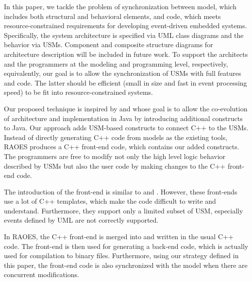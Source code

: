 In this paper, we tackle the problem of synchronization between model, which includes both structural and behavioral elements, and  code, which meets resource-constrained requirements for developing event-driven embedded systems.
Specifically, the system architecture is specified via UML class diagrams and the behavior via USMs.
Component and composite structure diagrams for architecture description will be included in future work.
To support the architects and the programmers at the modeling and programming level, respectively, equivalently, our goal is to allow the synchronization of USMs with full features and code.
The latter should be efficient (small in size and fast in event processing speed) to be fit into resource-constrained systems. 

Our proposed technique  is inspired by  \cite{aldrich2002archjava} and  \cite{ubayashi2010archface} whose goal is to allow the co-evolution of architecture and implementation in Java by introducing additional constructs to Java.
Our approach adds USM-based constructs to connect C++ to the USMs.
Instead of directly generating C++ code from models as the existing tools, RAOES produces a C++ front-end code, which contains our added constructs.
The programmers are free to modify not only the high level logic behavior described by USMs but also the user code by making changes to the C++ front-end code.

The introduction of the front-end is similar to  \cite{MSM} and  \cite{EUML}.
However, these front-ends use a lot of C++ templates, which make the code difficult to write and understand.
Furthermore, they support only a limited subset of USM, especially events defined by UML are not correctly supported.

In RAOES, the C++ front-end is merged into and written in the usual C++ code.
The front-end is then used for generating a back-end code, which is actually used for compilation to binary files.
Furthermore, using our strategy defined in this paper, the front-end code is also synchronized with the model when there are concurrent modifications.


